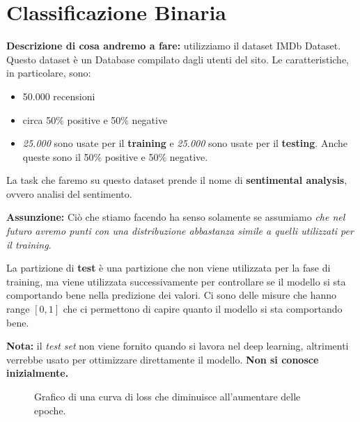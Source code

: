 \section{Classificazione Binaria}
\textbf{Descrizione di cosa andremo a fare:} utilizziamo il dataset IMDb Dataset.
Questo dataset è un Database compilato dagli utenti del sito. Le caratteristiche, in particolare, sono:
\begin{itemize}
    \item 50.000 recensioni
    \item circa 50\% positive e 50\% negative
    \item \textit{25.000} sono usate per il \textbf{training} e \textit{25.000} sono usate per il \textbf{testing}. Anche queste sono il 50\% positive e 50\% negative.
\end{itemize}

La task che faremo su questo dataset prende il nome di \textbf{sentimental
    analysis}, ovvero analisi del sentimento.

\textbf{Assunzione:} Ciò che stiamo facendo ha senso solamente se assumiamo \textit{che nel futuro avremo punti con una distribuzione abbastanza simile a quelli utilizzati per il training}.

La partizione di \textbf{test} è una partizione che non viene utilizzata per la
fase di training, ma viene utilizzata successivamente per controllare se il
modello si sta comportando bene nella predizione dei valori. Ci sono delle
misure che hanno range $[0,1]$ che ci permettono di capire quanto il modello si
sta comportando bene.

\textbf{Nota:} il \textit{test set} non viene fornito quando si lavora nel deep learning, altrimenti verrebbe usato per ottimizzare direttamente il modello. \textbf{Non si conosce inizialmente.}

\begin{figure}[H]
    \centering
    \caption{Grafico di una curva di loss che diminuisce all'aumentare delle epoche.}
    \label{fig:loss_curve}
\end{figure}

